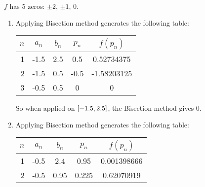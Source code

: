 \documentclass[../../../../Assignments.tex]{subfiles}
\begin{document}
\begin{solution}
    \(f\) has 5 zeros: \(\pm 2\), \(\pm 1\), \(0\).

    \begin{enumerate}[label = (\alph*)]
        \item Applying Bisection method generates the following table:

            \begin{table}[H]
                \centering
                \begin{tabular}{r S[table-format=-1.1] S[table-format=1.1] S[table-format=-1.1] S[table-format=-1.8]}
                    \toprule
                    \(n\)  &   {\(a_n\)}   &   {\(b_n\)}   &   {\(p_n\)}   &  {\(f(p_n)\)}  \\
                      &  -1.5         &  2.5          &   0.5         &   0.52734375   \\
                        2  &  -1.5         &  0.5          &  -0.5         &  -1.58203125   \\
                        3  &  -0.5         &  0.5          &   0           &   0            \\
                    \bottomrule
                \end{tabular}
            \end{table}

            So when applied on \(\interval{\num{-1.5}}{\num{2.5}}\), the
            Bisection method gives \(0\).

        \item Applying Bisection method generates the following table:

            \begin{table}[H]
                \centering
                \begin{tabular}{r S[table-format=-1.1] S[table-format=1.2] S[table-format=1.3] S[table-format=1.9]}
                    \toprule
                    \(n\)  &   {\(a_n\)}   &   {\(b_n\)}   &   {\(p_n\)}   &  {\(f(p_n)\)}  \\
                      &  -0.5         &  2.4          &  0.95         &  0.001398666   \\
                        2  &  -0.5         &  0.95         &  0.225        &  0.62070919    \\
                    \bottomrule
                \end{tabular}
            \end{table}


\end{enumerate}
\end{solution}
\end{document}
